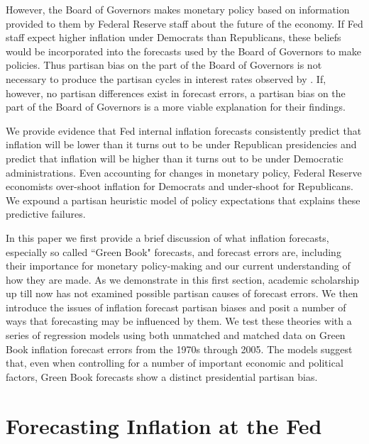 \documentclass[a4paper]{article}\usepackage{graphicx, color}
\begin{document}

However, the Board of Governors makes monetary policy based on information provided to them by Federal Reserve staff about the future of the economy. If Fed staff expect higher inflation under Democrats than Republicans, these beliefs would be incorporated into the forecasts used by the Board of Governors to make policies. Thus partisan bias on the part of the Board of Governors is not necessary to produce the partisan cycles in interest rates observed by \cite{Clark2011}. If, however, no partisan differences exist in forecast errors, a partisan bias on the part of the Board of Governors is a more viable explanation for their findings.

We provide evidence that Fed internal inflation forecasts consistently predict that inflation will be lower than it turns out to be under Republican presidencies and predict that inflation will be higher than it turns out to be under Democratic administrations. Even accounting for changes in monetary policy, Federal Reserve economists over-shoot inflation for Democrats and under-shoot for Republicans. We expound a partisan heuristic model of policy expectations that explains these predictive failures.

In this paper we first provide a brief discussion of what inflation forecasts, especially so called ``Green Book" forecasts, and forecast errors are, including their importance for monetary policy-making and our current understanding of how they are made. As we demonstrate in this first section, academic scholarship up till now has not examined possible partisan causes of forecast errors. We then introduce the issues of inflation forecast partisan biases and posit a number of ways that forecasting may be influenced by them. We test these theories with a series of regression models using both unmatched and matched data on Green Book inflation forecast errors from the 1970s through 2005. The models suggest that, even when controlling for a number of important economic and political factors, Green Book forecasts show a distinct presidential partisan bias. 


\section{Forecasting Inflation at the Fed}
\end{document}
